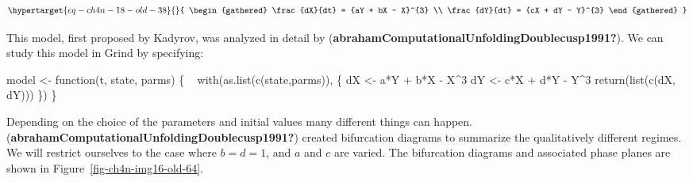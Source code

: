 \documentclass[
  a4paper,
  DIV=11,
  numbers=noendperiod,
  oneside]{scrreprt}
\newenvironment{Shaded}{\begin{snugshade}}{\end{snugshade}}
\newcommand{\ControlFlowTok}[1]{\textcolor[rgb]{0.00,0.23,0.31}{#1}}
\newcommand{\DecValTok}[1]{\textcolor[rgb]{0.68,0.00,0.00}{#1}}
\newcommand{\FunctionTok}[1]{\textcolor[rgb]{0.28,0.35,0.67}{#1}}
\newcommand{\NormalTok}[1]{\textcolor[rgb]{0.00,0.23,0.31}{#1}}
\newcommand{\OtherTok}[1]{\textcolor[rgb]{0.00,0.23,0.31}{#1}}
\newcommand{\SpecialCharTok}[1]{\textcolor[rgb]{0.37,0.37,0.37}{#1}}
\begin{document}
\begin{equation}\protect\hypertarget{eq-ch4n-18-old-38}{}{
\begin{gathered}
\frac{dX}{dt} = {aY + bX - X}^{3} \\
\frac{dY}{dt} = {cX + dY - Y}^{3} 
\end{gathered}
}\label{eq-ch4n-18-old-38}\end{equation}

This model, first proposed by Kadyrov, was analyzed in detail by
(\textbf{abrahamComputationalUnfoldingDoublecusp1991?}). We can study
this model in Grind by specifying:

\begin{Shaded}
\begin{Highlighting}[]
\NormalTok{model }\OtherTok{\textless{}{-}} \ControlFlowTok{function}\NormalTok{(t, state, parms) \{   }
  \FunctionTok{with}\NormalTok{(}\FunctionTok{as.list}\NormalTok{(}\FunctionTok{c}\NormalTok{(state,parms)), \{}
\NormalTok{    dX }\OtherTok{\textless{}{-}}\NormalTok{ a}\SpecialCharTok{*}\NormalTok{Y }\SpecialCharTok{+}\NormalTok{ b}\SpecialCharTok{*}\NormalTok{X }\SpecialCharTok{{-}}\NormalTok{ X}\SpecialCharTok{\^{}}\DecValTok{3} 
\NormalTok{    dY }\OtherTok{\textless{}{-}}\NormalTok{ c}\SpecialCharTok{*}\NormalTok{X }\SpecialCharTok{+}\NormalTok{ d}\SpecialCharTok{*}\NormalTok{Y }\SpecialCharTok{{-}}\NormalTok{ Y}\SpecialCharTok{\^{}}\DecValTok{3}
    \FunctionTok{return}\NormalTok{(}\FunctionTok{list}\NormalTok{(}\FunctionTok{c}\NormalTok{(dX, dY))) }
\NormalTok{  \})}
\NormalTok{\}}
\end{Highlighting}
\end{Shaded}

Depending on the choice of the parameters and initial values many
different things can happen.
(\textbf{abrahamComputationalUnfoldingDoublecusp1991?}) created
bifurcation diagrams to summarize the qualitatively different regimes.
We will restrict ourselves to the case where \(b = d = 1\), and \(a\)
and \(c\) are varied. The bifurcation diagrams and associated phase
planes are shown in Figure~\ref{fig-ch4n-img16-old-64}.
\end{document}

